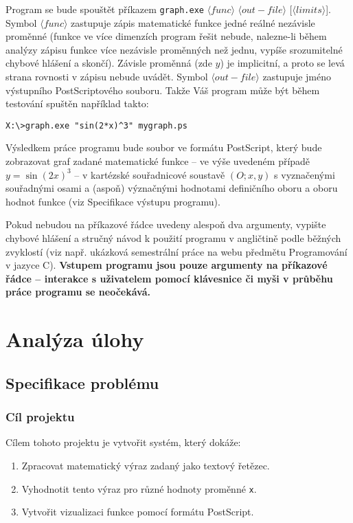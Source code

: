 \documentclass[12pt]{article} %
\begin{document}
Program se bude spouštět příkazem \texttt{graph.exe} $\langle func \rangle$ $\langle out-file \rangle$ [$\langle limits \rangle$]. Symbol $\langle func \rangle$ zastupuje zápis matematické funkce jedné reálné nezávisle proměnné (funkce ve více dimenzích program řešit nebude, nalezne-li během analýzy zápisu funkce více nezávisle proměnných než jednu, vypíše srozumitelné chybové hlášení a skončí). Závisle proměnná (zde $y$) je implicitní, a proto se levá strana rovnosti v zápisu nebude uvádět. Symbol $\langle out-file \rangle$ zastupuje jméno výstupního PostScriptového souboru. Takže Váš program může být během testování spuštěn například takto:
\begin{verbatim}
X:\>graph.exe "sin(2*x)^3" mygraph.ps
\end{verbatim}

Výsledkem práce programu bude soubor ve formátu PostScript, který bude zobrazovat graf zadané matematické funkce – ve výše uvedeném případě $y = \sin(2x)^3$ – v kartézské souřadnicové soustavě $(O; x,y)$ s vyznačenými souřadnými osami a (aspoň) význačnými hodnotami definičního oboru a oboru hodnot funkce (viz Specifikace výstupu programu).

Pokud nebudou na příkazové řádce uvedeny alespoň dva argumenty, vypište chybové hlášení a stručný návod k použití programu v angličtině podle běžných zvyklostí (viz např. ukázková semestrální práce na webu předmětu Programování v jazyce C). \textbf{Vstupem programu jsou pouze argumenty na příkazové řádce – interakce s uživatelem pomocí klávesnice či myši v průběhu práce programu se neočekává.}


\section{Analýza úlohy}
\subsection{Specifikace problému}
\subsubsection{Cíl projektu}
Cílem tohoto projektu je vytvořit systém, který dokáže:
\begin{enumerate}
  \item Zpracovat matematický výraz zadaný jako textový řetězec.
  \item Vyhodnotit tento výraz pro různé hodnoty proměnné \texttt{x}.
  \item Vytvořit vizualizaci funkce pomocí formátu PostScript.
\end{enumerate}
\end{document}
